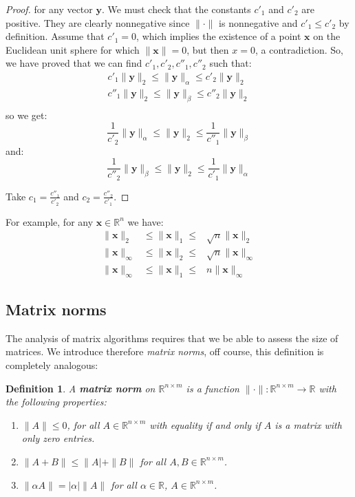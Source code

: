 \documentclass[a4paper,11pt]{report}
\newtheorem{definition}[theorem]{Definition}
\newcommand{\R}{{\mathbb R}}
\begin{document}
\begin{proof}
  for any vector $\mathbf{y}$.
  We must check that the constants $c'_1$ and $c'_2$ are positive. They are 
  clearly nonnegative since $\|\cdot\|$ is nonnegative and $c'_1\leq c'_2$ by 
  definition. Assume that $c'_1 = 0$, which implies the existence of a point $\mathbf{x}$
  on the Euclidean unit sphere for which $\|\mathbf{x}\| = 0$, but then $x = 0$, 
  a contradiction.
  So, we have proved that we can find $c'_1, c'_2, c''_1, c''_2$ such that:
  \begin{eqnarray*}
    c'_1\|\mathbf{y}\|_2 \leq \|\mathbf{y}\|_\alpha \leq c'_2\|\mathbf{y}\|_2\\
    c''_1\|\mathbf{y}\|_2 \leq \|\mathbf{y}\|_\beta \leq c''_2\|\mathbf{y}\|_2\\
  \end{eqnarray*}
  so we get:
  $$\frac{1}{c'_2}\|\mathbf{y}\|_\alpha \leq \|\mathbf{y}\|_2 \leq \frac{1}{c''_1}\|\mathbf{y}\|_\beta$$
and:
$$\frac{1}{c''_2}\|\mathbf{y}\|_\beta \leq \|\mathbf{y}\|_2 \leq \frac{1}{c'_1}\|\mathbf{y}\|_\alpha$$

  Take $c_1 = \frac{c''_1}{c'_2}$ and $c_2=\frac{c''_2}{c'_1}$.
\end{proof}
For example, for any $\mathbf{x} \in \R^n$ we have:
\begin{eqnarray*}
  \|\mathbf{x}\|_2 &\leq \|\mathbf{x}\|_1 \leq& \sqrt{n}\|\mathbf{x}\|_2\\
   \|\mathbf{x}\|_\infty &\leq \|\mathbf{x}\|_2 \leq& \sqrt{n}\|\mathbf{x}\|_\infty\\
     \|\mathbf{x}\|_\infty &\leq \|\mathbf{x}\|_1 \leq& n\|\mathbf{x}\|_\infty
  \end{eqnarray*}
\subsection{Matrix norms}
The analysis of matrix algorithms requires that we be able to assess the size of 
matrices. We introduce therefore \textit{matrix norms}, off course, this 
definition is completely analogous:
\begin{definition}
  A \textbf{matrix norm} on $\R^{n\times m}$ is a function $\|\cdot\|: \R^{n\times m} \to \R$ with 
  the following properties:
  \begin{enumerate}
 \item $\|A\| \leq 0$, for all $A \in \R^{n\times m}$ with equality if 
 and only if $A$ is a matrix with only zero entries.
 \item $\|A + B\| \leq \|A| + \|B\|$ for 
 all $A, B \in \R^{n\times m}$.
 \item $\|\alpha A\| = |\alpha|\|A\|$ for all $\alpha \in \R$, $A \in 
 \R^{n\times m}$.
  \end{enumerate}
\end{definition}
\end{document}
